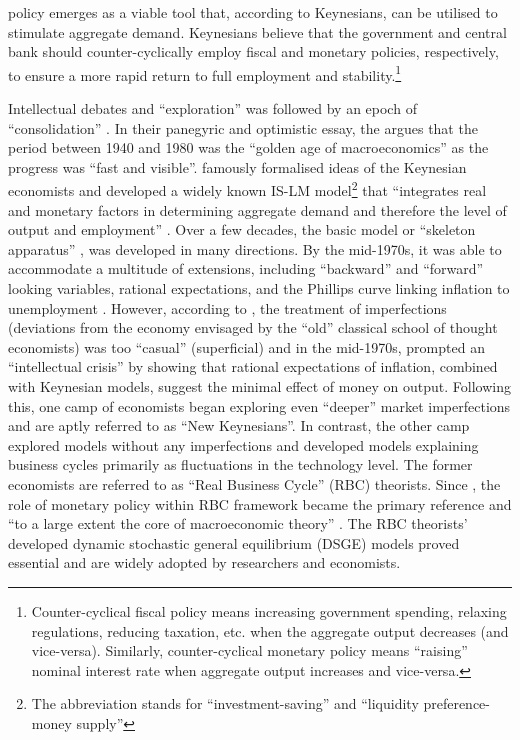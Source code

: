 policy emerges as a viable tool that, according to Keynesians, can be utilised to stimulate aggregate demand. Keynesians believe that the government and central bank should counter-cyclically employ fiscal and monetary policies, respectively, to ensure a more rapid return to full employment and stability.\footnote{Counter-cyclical fiscal policy means increasing government spending, relaxing regulations, reducing taxation, etc. when the aggregate output decreases (and vice-versa). Similarly, counter-cyclical monetary policy means ``raising'' nominal interest rate when aggregate output increases and vice-versa.}

Intellectual debates and ``exploration'' was followed by an epoch of ``consolidation'' \textcite{blanchard_2000_what}. In their panegyric and optimistic essay, the \citereset\textcite{blanchard_2000_what} argues that the period between 1940 and 1980 was the ``golden age of macroeconomics'' \parencite[1379]{blanchard_2000_what} as the progress was ``fast and visible''. \textcite{hicks_1937_mr} famously formalised ideas of the Keynesian economists and developed a widely known IS-LM model\footnote{The abbreviation stands for ``investment-saving'' and ``liquidity preference-money supply''} that ``integrates real and monetary factors in determining aggregate demand and therefore the level of output and employment'' \parencite[90]{snowdon_1994_a}. Over a few decades, the basic model or ``skeleton apparatus'' \parencite[158]{hicks_1937_mr}, was developed in many directions. By the mid-1970s, it was able to accommodate a multitude of extensions, including ``backward'' and ``forward'' looking variables, rational expectations, and the Phillips curve linking inflation to unemployment \parencite[1382]{blanchard_2000_what}. However, according to \citereset\textcite[1382]{blanchard_2000_what}, the treatment of imperfections (deviations from the economy envisaged by the ``old'' classical school of thought economists) was too ``casual'' (superficial) and in the mid-1970s, \textcite{sargent_1973_rational} prompted an ``intellectual crisis'' \parencite[1382]{blanchard_2000_what} by showing that rational expectations of inflation, combined with Keynesian models, suggest the minimal effect of money on output. Following this, one camp of economists began exploring even ``deeper'' market imperfections and are aptly referred to as ``New Keynesians''. In contrast, the other camp explored models without any imperfections and developed models explaining business cycles primarily as fluctuations in the technology level. The former economists are referred to as ``Real Business Cycle'' (RBC) theorists. Since \textcites{kydland_1982_time}{prescott_1986_theory}, the role of monetary policy within RBC framework became the primary reference and ``to a large extent the core of macroeconomic theory'' \parencite[2]{jordigal_2015_monetary}. The RBC theorists' developed dynamic stochastic general equilibrium (DSGE) models proved essential and are widely adopted by researchers and economists.

